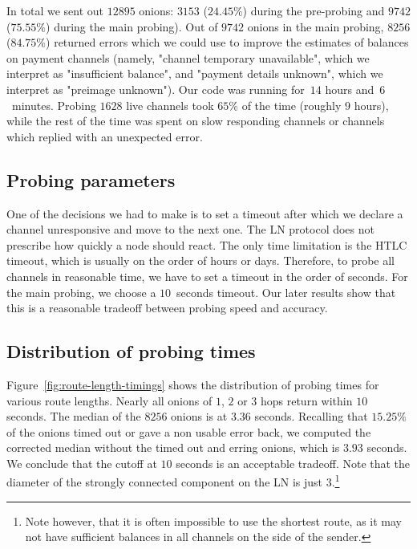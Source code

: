 In total we sent out $12895$ onions: $3153$ ($24.45\%$) during the pre-probing and $9742$ ($75.55\%$) during the main probing).
Out of $9742$ onions in the main probing, $8256$ ($84.75\%$) returned errors which we could use to improve the estimates of balances on payment channels (namely, "channel temporary unavailable", which we interpret as "insufficient balance", and "payment details unknown", which we interpret as "preimage unknown").
Our code was running for~$14$ hours and~$6$~minutes. %
Probing $1628$ live channels took $65\%$ of the time (roughly $9$ hours), while the rest of the time was spent on slow responding channels or channels which replied with an unexpected error.

\subsection{Probing parameters}
One of the decisions we had to make is to set a timeout after which we declare a channel unresponsive and move to the next one.
The LN protocol does not prescribe how quickly a node should react.
The only time limitation is the HTLC timeout, which is usually on the order of hours or days.
Therefore, to probe all channels in reasonable time, we have to set a timeout in the order of seconds.
For the main probing, we choose a $10$~seconds timeout.
Our later results show that this is a reasonable tradeoff between probing speed and accuracy.

\subsection{Distribution of probing times}
Figure~\ref{fig:route-length-timings} shows the distribution of probing times for various route lengths.
Nearly all onions of $1$, $2$ or $3$ hops return within $10$ seconds.
The median of the $8256$ onions is at $3.36$ seconds.
Recalling that $15.25\%$ of the onions timed out or gave a non usable error back, we computed the corrected median without the timed out and erring onions, which is $3.93$ seconds. 
We conclude that the cutoff at $10$ seconds is an acceptable tradeoff.
Note that the diameter of the strongly connected component on the LN is just $3$.\footnote{Note however, that it is often impossible to use the shortest route, as it may not have sufficient balances in all channels on the side of the sender.}

